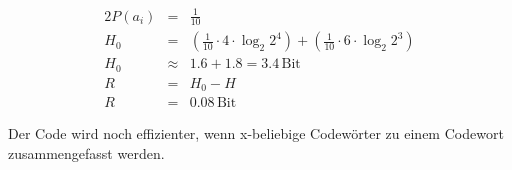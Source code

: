 \documentclass[10pt,a4paper,oneside,ngerman,numbers=noenddot]{scrartcl}
\begin{document}

\begin{alignat*}{2}
P(a_{i}) &=& \frac{1}{10} \\
H_{0} &=& (\frac{1}{10} \cdot 4 \cdot \log_{2}{2^{4}}) + (\frac{1}{10} \cdot 6 \cdot \log_{2}{2^{3}}) \\
H_{0} &\approx & 1.6 + 1.8 = 3.4\, \text{Bit} \\
R &=& H_{0} - H \\
R &=& 0.08\,\text{Bit}
\end{alignat*}

Der Code wird noch effizienter, wenn x-beliebige Codewörter zu einem Codewort zusammengefasst werden.
\end{document}

